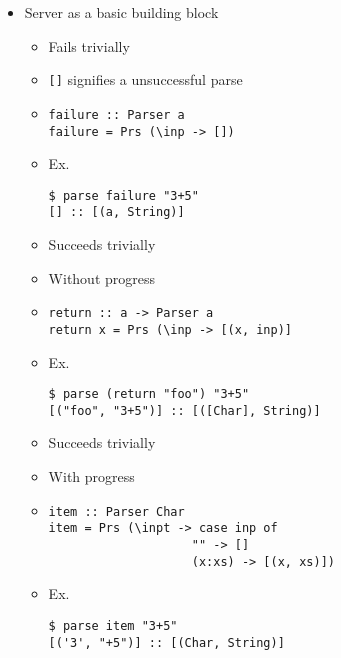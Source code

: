 \begin{itemize}
        \begin{itemize}
            \item Server as a basic building block
                \begin{itemize}
                    \item Fails trivially
                    \item \verb+[]+ signifies a unsuccessful parse
                    \item
\begin{verbatim}
failure :: Parser a
failure = Prs (\inp -> [])
\end{verbatim}
                    \item Ex.
\begin{verbatim}
$ parse failure "3+5"
[] :: [(a, String)]
\end{verbatim}
                \end{itemize}
                \begin{itemize}
                    \item Succeeds trivially
                    \item Without progress
                    \item
\begin{verbatim}
return :: a -> Parser a
return x = Prs (\inp -> [(x, inp)]
\end{verbatim}
                    \item Ex.
\begin{verbatim}
$ parse (return "foo") "3+5"
[("foo", "3+5")] :: [([Char], String)]
\end{verbatim}
                \end{itemize}
                \begin{itemize}
                    \item Succeeds trivially
                    \item With progress
                    \item
\begin{verbatim}
item :: Parser Char
item = Prs (\inpt -> case inp of
                    "" -> []
                    (x:xs) -> [(x, xs)])
\end{verbatim}
                    \item Ex.
\begin{verbatim}
$ parse item "3+5"
[('3', "+5")] :: [(Char, String)]
\end{verbatim}
                \end{itemize}

\end{itemize}
\end{itemize}
